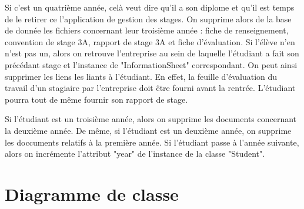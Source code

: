 \documentclass{scrreprt}
\begin{document}
Si c'est un quatrième année, celà veut dire qu'il a son diplome et qu'il est temps
de le retirer ce l'application de gestion des stages. On supprime alors de la base de donnée les fichiers concernant leur troisième année :
fiche de renseignement, convention de stage 3A, rapport de stage 3A et fiche d'évaluation. Si l'élève n'en n'est pas un, alors on retrouve 
l'entreprise au sein de laquelle l'étudiant a fait son précédant stage et l'instance de "InformationSheet" correspondant. On peut ainsi supprimer les liens
les liants à l'étudiant. En effet, la feuille d'évaluation du travail d'un stagiaire par l'entreprise doit être fourni avant la rentrée. 
L'étudiant pourra tout de même fournir son rapport de stage. 

Si l'étudiant est un troisième année, alors on supprime les documents concernant la deuxième année. De même, si l'étudiant est un deuxième année, 
on supprime les doccuments relatifs à la première année. Si l'étudiant passe à l'année suivante, alors on incrémente l'attribut "year" de l'instance
de la classe "Student". 

\newpage

\newpage
\chapter{Diagramme de classe}
\end{document}
